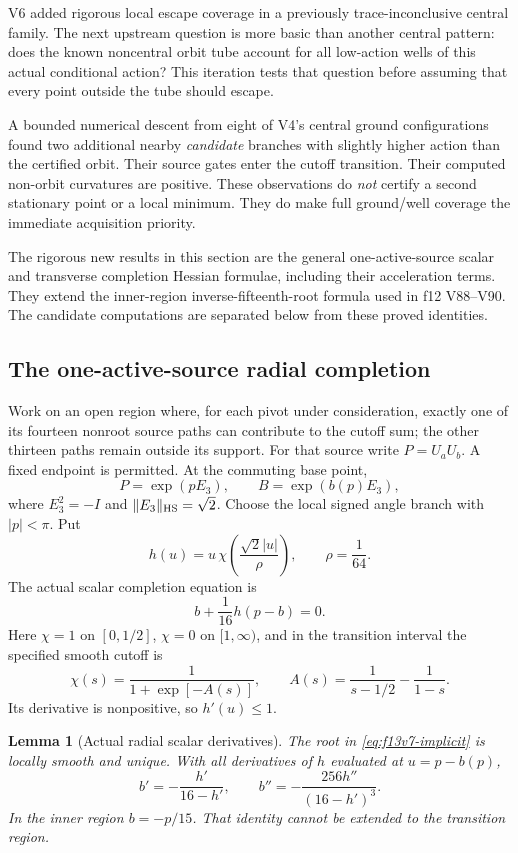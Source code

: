 \documentclass[11pt,oneside]{article}
\newtheorem{lemma}[theorem]{Lemma}
\begin{document}
V6 added rigorous local escape coverage in a previously
trace-inconclusive central family. The next upstream
question is more basic than another central pattern:
does the known noncentral orbit tube account for all
low-action wells of this actual conditional action?
This iteration tests that question before assuming
that every point outside the tube should escape.

A bounded numerical descent from eight of V4's
central ground configurations found two additional
nearby \emph{candidate} branches with slightly higher
action than the certified orbit. Their source gates
enter the cutoff transition. Their computed non-orbit
curvatures are positive. These observations do
\emph{not} certify a second stationary point or a
local minimum. They do make full ground/well
coverage the immediate acquisition priority.

The rigorous new results in this section are the
general one-active-source scalar and transverse
completion Hessian formulae, including their
acceleration terms. They extend the inner-region
inverse-fifteenth-root formula used in f12 V88--V90.
The candidate computations are separated below from
these proved identities.

\subsection{The one-active-source radial completion}

Work on an open region where, for each pivot under
consideration, exactly one of its fourteen nonroot
source paths can contribute to the cutoff sum;
the other thirteen paths remain outside its support.
For that source write \(P=U_aU_b\). A fixed endpoint
is permitted. At the commuting base point,
\[
 P=\exp(pE_3),\qquad B=\exp(b(p)E_3),
\]
where \(E_3^2=-I\) and
\(\|E_3\|_{\rm HS}=\sqrt2\).
Choose the local signed angle branch with
\(|p|<\pi\). Put
\[
 h(u)=u\,\chi\!\left(\frac{\sqrt2|u|}{\rho}\right),
 \qquad \rho=\frac1{64}.
\]
The actual scalar completion equation is
\begin{equation}\label{eq:f13v7-implicit}
 b+\frac1{16}h(p-b)=0 .
\end{equation}
Here \(\chi=1\) on \([0,1/2]\), \(\chi=0\)
on \([1,\infty)\), and in the transition interval
the specified smooth cutoff is
\[
 \chi(s)=\frac1{1+\exp[-A(s)]},\qquad
 A(s)=\frac1{s-1/2}-\frac1{1-s}.
\]
Its derivative is nonpositive, so \(h'(u)\le1\).

\begin{lemma}[Actual radial scalar derivatives]
\label{lem:f13v7-scalar}
The root in \eqref{eq:f13v7-implicit} is locally
smooth and unique. With all derivatives of \(h\)
evaluated at \(u=p-b(p)\),
\begin{equation}\label{eq:f13v7-bderivatives}
 b'=-\frac{h'}{16-h'},\qquad
 b''=-\frac{256h''}{(16-h')^3}.
\end{equation}
In the inner region \(b=-p/15\). That identity
cannot be extended to the transition region.
\end{lemma}
\end{document}
